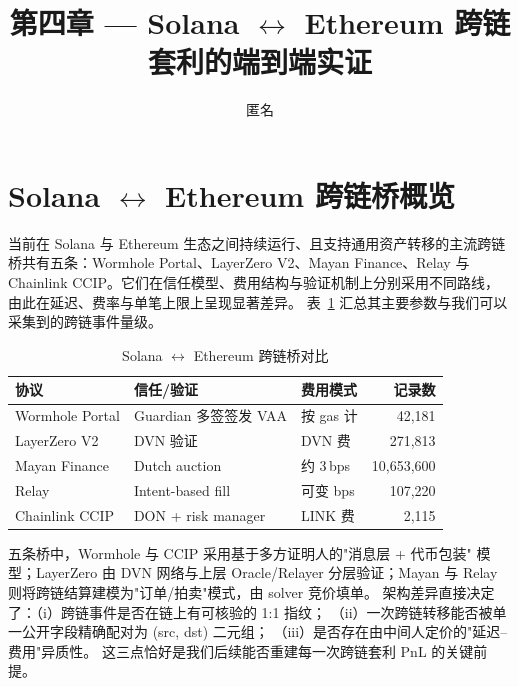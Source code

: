 \documentclass[sigconf,nonacm,10pt]{acmart}
\title{第四章 --- Solana $\leftrightarrow$ Ethereum 跨链套利的端到端实证}
\author{匿名}
\affiliation{\institution{-}\country{-}}
\begin{document}
\maketitle

\section{Solana $\leftrightarrow$ Ethereum 跨链桥概览}
\label{sec:bridges}

当前在 Solana 与 Ethereum 生态之间持续运行、且支持通用资产转移的主流跨链
桥共有五条：Wormhole Portal、LayerZero V2、Mayan Finance、Relay 与
Chainlink CCIP。它们在信任模型、费用结构与验证机制上分别采用不同路线，
由此在延迟、费率与单笔上限上呈现显著差异。
表~\ref{tab:bridges} 汇总其主要参数与我们可以采集到的跨链事件量级。

\begin{table}[h]
  \centering
  \small
  \caption{Solana $\leftrightarrow$ Ethereum 跨链桥对比}
  \label{tab:bridges}
  \begin{tabular}{lllr}
    \toprule
    \textbf{协议} & \textbf{信任/验证} & \textbf{费用模式} & \textbf{记录数} \\
    \midrule
    Wormhole Portal   & Guardian 多签签发 VAA    & 按 gas 计        & 42{,}181 \\
    LayerZero V2      & DVN 验证                 & DVN 费           & 271{,}813 \\
    Mayan Finance     & Dutch auction            & 约 3\,bps        & 10{,}653{,}600 \\
    Relay             & Intent-based fill        & 可变 bps          & 107{,}220 \\
    Chainlink CCIP    & DON + risk manager       & LINK 费          & 2{,}115 \\
    \bottomrule
  \end{tabular}
\end{table}

五条桥中，Wormhole 与 CCIP 采用基于多方证明人的"消息层 + 代币包装"
模型；LayerZero 由 DVN 网络与上层 Oracle/Relayer 分层验证；Mayan 与
Relay 则将跨链结算建模为"订单/拍卖"模式，由 solver 竞价填单。
架构差异直接决定了：（i）跨链事件是否在链上有可核验的 1:1 指纹；
（ii）一次跨链转移能否被单一公开字段精确配对为 (src, dst) 二元组；
（iii）是否存在由中间人定价的"延迟--费用"异质性。
这三点恰好是我们后续能否重建每一次跨链套利 PnL 的关键前提。
\end{document}
